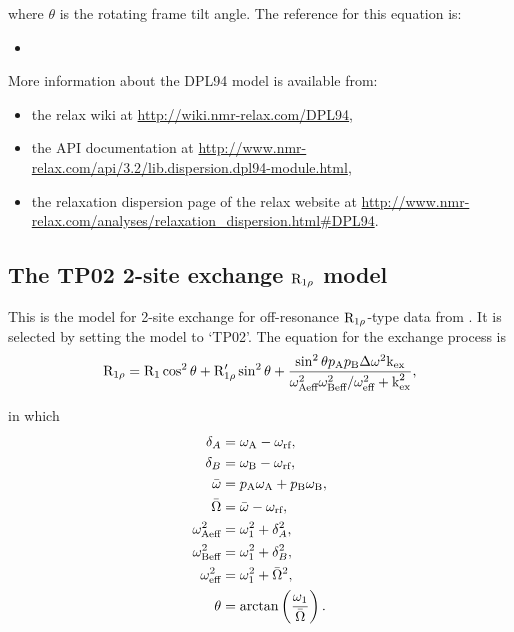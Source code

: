 where $\theta$ is the rotating frame tilt angle.
The reference for this equation is:
\begin{itemize}
  \item {}
\end{itemize}

More information about the DPL94 model is available from:
\begin{itemize}
  \item the relax wiki at \url{http://wiki.nmr-relax.com/DPL94},
  \item the API documentation at \url{http://www.nmr-relax.com/api/3.2/lib.dispersion.dpl94-module.html},
  \item the relaxation dispersion page of the relax website at \url{http://www.nmr-relax.com/analyses/relaxation\_dispersion.html#DPL94}.
\end{itemize}



\subsection{The TP02 2-site exchange $\mathrm{R}_{1\rho}$ model}
\label{sect: dispersion: TP02 model}

This is the model for 2-site exchange for off-resonance $\mathrm{R}_{1\rho}$-type data from \citet{TrottPalmer02}.
It is selected by setting the model to `TP02'.
The equation for the exchange process is
\begin{equation}
    \mathrm{R}_{1\rho} = \mathrm{R}_1\cos^2\theta + \mathrm{R}_{1\rho}'\sin^2\theta + \frac{\sin^2\theta p_{\textrm{A}}p_{\textrm{B}}\Delta\omega^2\textrm{k}_{\textrm{ex}}}{\omega_\textrm{Aeff}^2\omega_\textrm{Beff}^2/\omega_\textrm{eff}^2 + \textrm{k}_{\textrm{ex}}^2},
\end{equation}

in which
\begin{subequations}
\begin{align}
    \delta_A &= \omega_{\textrm{A}} - \omega_{\textrm{rf}}, \label{eq: deltaA}\\
    \delta_B &= \omega_{\textrm{B}} - \omega_{\textrm{rf}}, \label{eq: deltaB} \\
    \bar\omega &= p_{\textrm{A}}\omega_{\textrm{A}} + p_{\textrm{B}}\omega_{\textrm{B}}, \\
    \bar\Omega &= \bar\omega - \omega_{\textrm{rf}}, \\
    \omega_\textrm{Aeff}^2 &= \omega_1^2 + \delta_A^2, \\
    \omega_\textrm{Beff}^2 &= \omega_1^2 + \delta_B^2, \\
    \omega_\textrm{eff}^2 &= \omega_1^2 + \bar\Omega^2, \\
    \theta &= \arctan \left( \frac{\omega_1}{\bar\Omega} \right).
\end{align}
\end{subequations}

